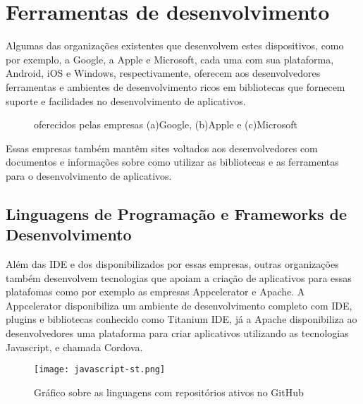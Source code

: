 \chapter{Ferramentas de desenvolvimento}
Algumas das organizações existentes que desenvolvem estes dispositivos, como por exemplo, a Google, a Apple e Microsoft, cada uma com sua plataforma, Android, iOS e Windows, respectivamente, oferecem aos desenvolvedores ferramentas e ambientes de desenvolvimento ricos em bibliotecas que fornecem suporte e facilidades no desenvolvimento de aplicativos.

\begin{figure}[h]
	\center
	\qquad
	\qquad
	\caption[IDE oferecidos pelas empresas]{ oferecidos pelas empresas (a)Google, (b)Apple e (c)Microsoft}
\end{figure}

Essas empresas também mantêm sites voltados aos desenvolvedores com documentos e informações sobre como utilizar as bibliotecas e as ferramentas para o desenvolvimento de aplicativos.

\section{Linguagens de Programação e Frameworks de Desenvolvimento}
Além das IDE e dos  disponibilizados por essas empresas, outras organizações também desenvolvem tecnologias que apoiam a criação de aplicativos para essas platafomas como por exemplo as empresas Appcelerator e Apache. A Appcelerator disponibiliza um ambiente de desenvolvimento completo com IDE, plugins e bibliotecas conhecido como Titanium IDE, já a Apache disponibiliza ao desenvolvedores uma plataforma para criar aplicativos utilizando as tecnologias Javascript,  e  chamada Cordova.

\begin{figure}[!htb]
	\centering
	\texttt{[image: javascript-st.png]} %
	\caption[Linguagens com maior número de repositórios ativos no GitHub]{Gráfico sobre as linguagens com repositórios ativos no GitHub}
	\label{fig:javascript}
\end{figure}

